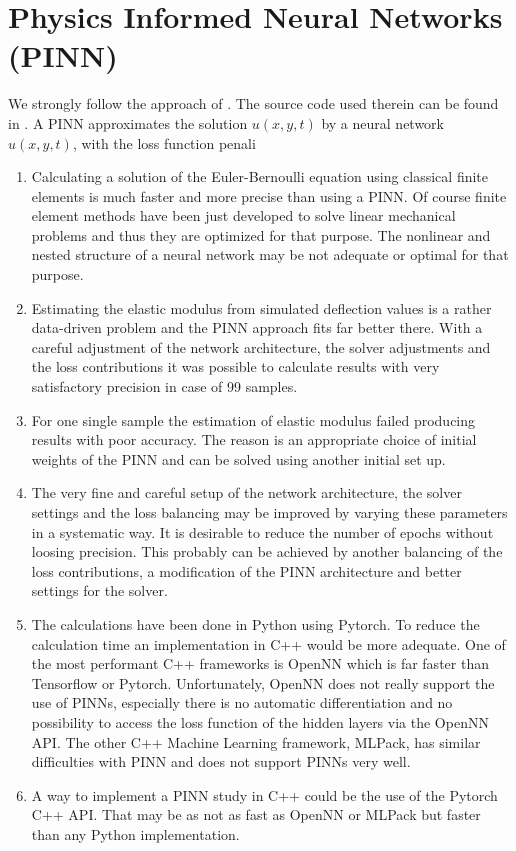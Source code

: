 \documentclass[a4paper,11pt]{article}
\begin{document}
\section{Physics Informed Neural Networks (PINN)}
We strongly follow the approach of \cite{aryal2024a}. The source code used therein can be found in \cite{aryal2024b}.
A PINN approximates the solution $u(x,y,t)$ by a neural network $\hat{u}(x,y,t)$, with the loss function penali
\begin{enumerate}
\item
Calculating a solution of the Euler-Bernoulli equation using classical finite elements is much faster and more precise than using a PINN. Of course finite element methods have been just developed to solve linear mechanical problems and thus they are optimized for that purpose. The nonlinear and nested structure of  a neural network may be not adequate or optimal for that purpose.
\item
Estimating the elastic modulus from simulated deflection values is a rather data-driven problem and the PINN approach fits far better there. With a careful adjustment of the network architecture, the solver adjustments and the loss contributions it was possible to calculate results with very satisfactory precision in case of 99 samples.
\item
For one single sample the estimation of elastic modulus failed producing results with poor accuracy. The reason is an appropriate choice of initial weights of the PINN and can be solved using another initial set up.
\item
The very fine and careful setup of the network architecture, the solver settings and the loss balancing may be improved by varying these parameters in a systematic way. It is desirable to reduce the number of epochs without loosing precision. This probably can be achieved by another balancing of the loss contributions, a modification of the PINN architecture and better settings for the solver.
\item
The calculations have been done in Python using Pytorch. To reduce the calculation time an implementation in C++ would be more adequate. One of the most performant  C++ frameworks is OpenNN which is far faster than Tensorflow or Pytorch. Unfortunately, OpenNN does not really support the use of PINNs, especially there is no automatic differentiation and no possibility to access the loss function of the hidden layers via the OpenNN API. The other C++ Machine Learning framework, MLPack, has similar difficulties with PINN and does not support PINNs very well.
\item
A way to implement a PINN study in C++ could be the use of the Pytorch C++ API. That may be as not as fast as OpenNN or MLPack but faster than any Python implementation.
\end{enumerate}
\end{document}

